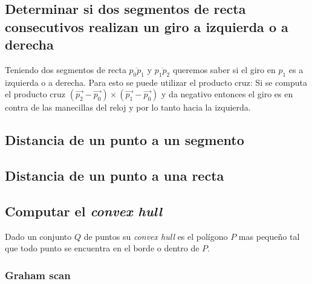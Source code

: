 \begin{multicols}{2}
\subsection{Determinar si dos segmentos de recta consecutivos realizan un giro a izquierda o a derecha}
Teniendo dos segmentos de recta $\overline{p_0p_1}$	y $\overline{p_1p_2}$ queremos saber si el giro en $p_1$ es a izquierda o a derecha. Para esto se puede utilizar el producto cruz:
Si se computa el producto cruz $(\vec{p_2}-\vec{p_0})\times (\vec{p_1}-\vec{p_0})$ y da negativo entonces el giro es en contra de las manecillas del reloj y por lo tanto hacia la izquierda. 
\end{multicols}
\pagebreak
\subsection{Distancia de un punto a un segmento}
\subsection{Distancia de un punto a una recta}
\subsection{Computar el \textit{convex hull}}
Dado un conjunto $Q$ de puntos su \textit{convex hull} es el pol\'igono $P$ mas peque\~{n}o tal que todo punto se encuentra en el borde o dentro de $P$.
\subsubsection{Graham scan}
\pagebreak